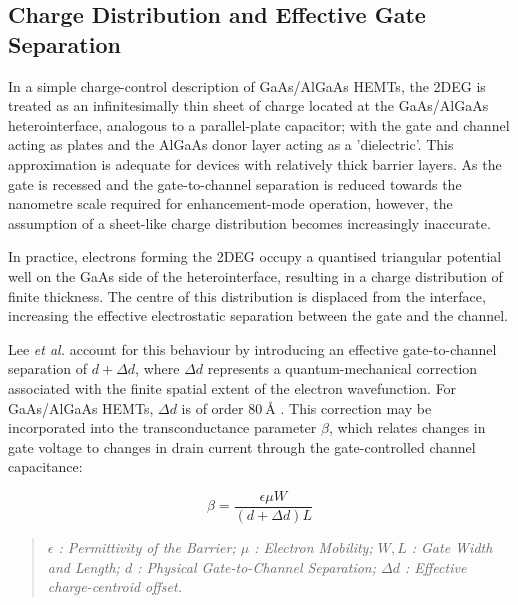 \subsection{Charge Distribution and Effective Gate Separation}

In a simple charge-control description of GaAs/AlGaAs HEMTs, the 2DEG is
treated as an infinitesimally thin sheet of charge located at the
GaAs/AlGaAs heterointerface, analogous to a parallel-plate capacitor; 
with the gate and channel acting as plates and the AlGaAs donor layer acting as a 'dielectric'. \cite{ivcv-hemt}
This approximation is adequate for devices with relatively thick
barrier layers. As the gate is recessed and the gate-to-channel
separation is reduced towards the nanometre scale required for
enhancement-mode operation, however, the assumption of a sheet-like
charge distribution becomes increasingly inaccurate.

\vspace{2mm}

In practice, electrons forming the 2DEG occupy a quantised triangular
potential well on the GaAs side of the heterointerface, resulting in a
charge distribution of finite thickness. The centre of this
distribution is displaced from the interface, increasing the effective
electrostatic separation between the gate and the channel.

\vspace{2mm}

Lee \textit{et al.} account for this behaviour by introducing an
effective gate-to-channel separation of $d + \Delta d$, where
$\Delta d$ represents a quantum-mechanical correction associated with
the finite spatial extent of the electron wavefunction. For
GaAs/AlGaAs HEMTs, $\Delta d$ is of order $80~\text{\AA}$
\cite{ivcv-hemt}. This correction may be incorporated into the
transconductance parameter $\beta$, which relates changes in gate
voltage to changes in drain current through the gate-controlled channel
capacitance:

\begin{equation}
    \beta = \frac{\epsilon \mu W}{(d + \Delta d)L}
\end{equation}

\begin{quote}
    \footnotesize
    \textit{$\epsilon$ : Permittivity of the Barrier; $\mu$ : Electron Mobility; 
    $W, L$ : Gate Width and Length; $d$ : Physical Gate-to-Channel Separation; 
    $\Delta d$ : Effective charge-centroid offset.}
\end{quote}

